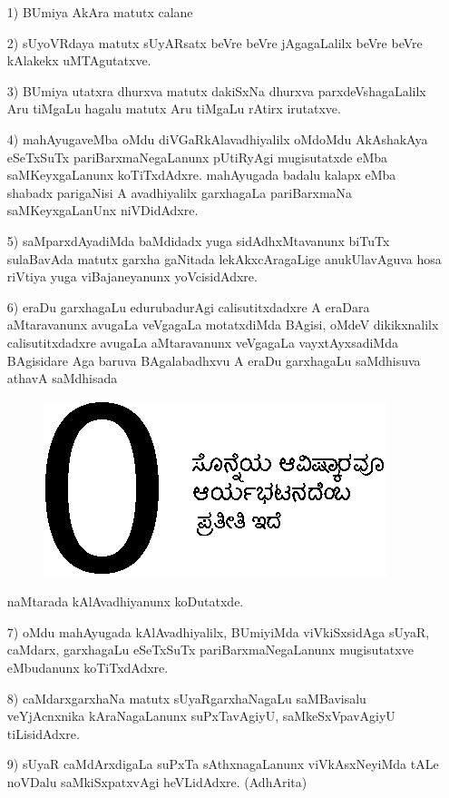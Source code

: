 \begin{itemize}
\item[{\rm 1)}] BUmiya AkAra matutx calane
  
\item[{\rm 2)}] sUyoVRdaya matutx sUyARsatx beVre beVre jAgagaLalilx beVre beVre kAlakekx uMTAgutatxve.
  
\item[{\rm 3)}] BUmiya utatxra dhurxva matutx dakiSxNa dhurxva parxdeVshagaLalilx Aru tiMgaLu hagalu matutx Aru tiMgaLu rAtirx irutatxve.

\item[{\rm 4)}] mahAyugaveMba oMdu diVGaRkAlavadhiyalilx oMdoMdu AkAshakAya eSeTxSuTx pariBarxmaNegaLanunx pUtiRyAgi mugisutatxde eMba saMKeyxgaLanunx koTiTxdAdxre. mahAyugada badalu kalapx eMba shabadx parigaNisi A avadhiyalilx garxhagaLa pariBarxmaNa saMKeyxgaLanUnx niVDidAdxre. 

\item[{\rm 5)}] saMparxdAyadiMda baMdidadx yuga sidAdhxMtavanunx biTuTx sulaBavAda matutx garxha gaNitada lekAkxcAragaLige anukUlavAguva hosa riVtiya yuga viBajaneyanunx yoVcisidAdxre. 

\item[{\rm 6)}] eraDu garxhagaLu edurubadurAgi calisutitxdadxre A eraDara aMtaravanunx avugaLa veVgagaLa motatxdiMda BAgisi, oMdeV dikikxnalilx calisutitxdadxre avugaLa aMtaravanunx veVgagaLa vayxtAyxsadiMda BAgisidare Aga baruva BAgalabadhxvu A eraDu garxhagaLu saMdhisuva athavA saMdhisada
\begin{figure}[H]
\centering
\includegraphics{src/figures/fig17.eps}
\end{figure}
  naMtarada kAlAvadhiyanunx koDutatxde.
  
\item[{\rm 7)}] oMdu mahAyugada kAlAvadhiyalilx, BUmiyiMda viVkiSxsidAga sUyaR, caMdarx, garxhagaLu eSeTxSuTx pariBarxmaNegaLanunx mugisutatxve eMbudanunx koTiTxdAdxre. 

\item[{\rm 8)}] caMdarxgarxhaNa matutx sUyaRgarxhaNagaLu saMBavisalu veYjAcnxnika kAraNagaLanunx suPxTavAgiyU, saMkeSxVpavAgiyU tiLisidAdxre. 
  
\item[{\rm 9)}] sUyaR caMdArxdigaLa suPxTa sAthxnagaLanunx viVkAsxNeyiMda tALe noVDalu saMkiSxpatxvAgi heVLidAdxre. (AdhArita)
\end{itemize}

